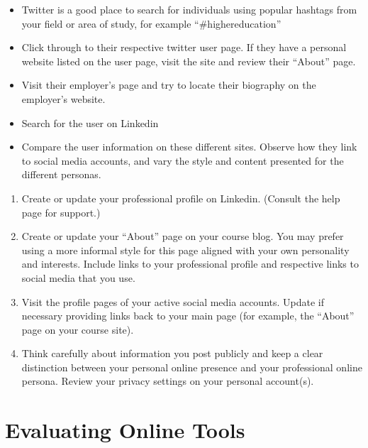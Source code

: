 \documentclass[
]{book}
\providecommand{\tightlist}{%
  \setlength{\itemsep}{0pt}\setlength{\parskip}{0pt}}
\theoremstyle{definition}
\theoremstyle{definition}
\theoremstyle{definition}
\theoremstyle{definition}
\theoremstyle{remark}
\begin{document}
\begin{reflect}
\begin{itemize}
\tightlist
\item
  Twitter is a good place to search for individuals using popular hashtags from your field or area of study, for example ``\#highereducation''\\
\item
  Click through to their respective twitter user page. If they have a personal website listed on the user page, visit the site and review their ``About'' page.\\
\item
  Visit their employer's page and try to locate their biography on the employer's website.\\
\item
  Search for the user on Linkedin\\
\item
  Compare the user information on these different sites. Observe how they link to social media accounts, and vary the style and content presented for the different personas.
\end{itemize}

\begin{enumerate}
\def\labelenumi{\arabic{enumi}.}
\setcounter{enumi}{3}
\item
  Create or update your professional profile on Linkedin. (Consult the help page for support.)
\item
  Create or update your ``About'' page on your course blog. You may prefer using a more informal style for this page aligned with your own personality and interests. Include links to your professional profile and respective links to social media that you use.
\item
  Visit the profile pages of your active social media accounts. Update if necessary providing links back to your main page (for example, the ``About'' page on your course site).
\item
  Think carefully about information you post publicly and keep a clear distinction between your personal online presence and your professional online persona. Review your privacy settings on your personal account(s).
\end{enumerate}
\end{reflect}

\hypertarget{evaluating-online-tools}{%
\section{Evaluating Online Tools}\label{evaluating-online-tools}}
\end{document}

